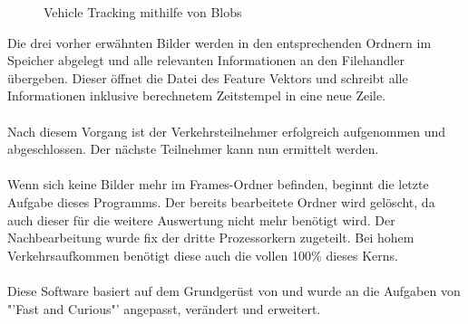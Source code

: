 \begin{figure}[H]
\caption{Vehicle Tracking mithilfe von Blobs}
\label{bMotionDetection}
\end{figure}

Die drei vorher erwähnten Bilder werden in den entsprechenden Ordnern im Speicher abgelegt und alle relevanten Informationen an den Filehandler übergeben. Dieser öffnet die Datei des Feature Vektors und schreibt alle Informationen inklusive berechnetem Zeitstempel in eine neue Zeile. \\\\
Nach diesem Vorgang ist der Verkehrsteilnehmer erfolgreich aufgenommen und abgeschlossen. Der nächste Teilnehmer kann nun ermittelt werden.\\\\
Wenn sich keine Bilder mehr im Frames-Ordner befinden, beginnt die letzte Aufgabe dieses Programms. Der bereits bearbeitete Ordner wird gelöscht, da auch dieser für die weitere Auswertung nicht mehr benötigt wird. Der Nachbearbeitung wurde fix der dritte Prozessorkern zugeteilt. Bei hohem Verkehrsaufkommen benötigt diese auch die vollen 100\% dieses Kerns.\\\\
Diese Software basiert auf dem Grundgerüst von \cite{OpenCVCC} und wurde an die Aufgaben von "'Fast and Curious"' angepasst, verändert und erweitert.

